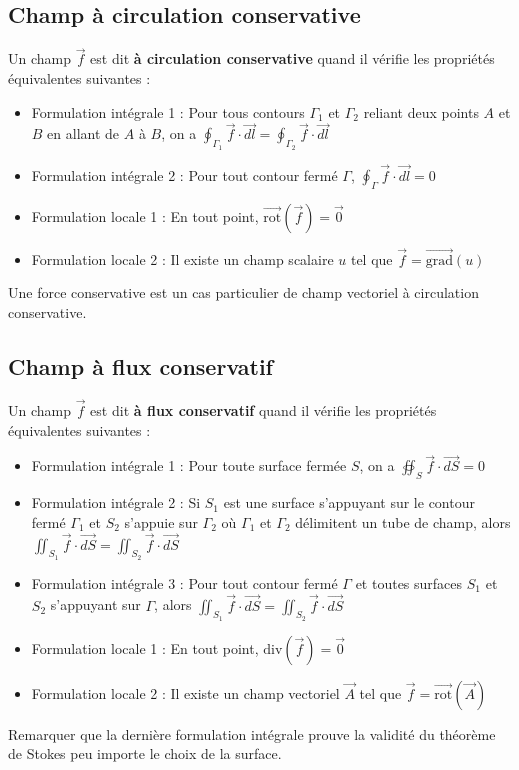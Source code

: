 \documentclass[french]{book}
\theoremstyle{plain}
\theoremstyle{definition}
\theoremstyle{remark}
\newcommand{\grad}{\overrightarrow{\text{grad}}}
\newcommand{\rot}{\overrightarrow{\text{rot}}}
\renewcommand{\div}{\text{div}}
\begin{document}
\subsection{Champ à circulation conservative}
Un champ $\overrightarrow{f}$ est dit \textbf{à circulation conservative} quand il vérifie les propriétés équivalentes suivantes :
\begin{itemize}
	\item Formulation intégrale 1 : Pour tous contours $\Gamma_1$ et $\Gamma_2$ reliant deux points $A$ et $B$ en allant de $A$ à $B$, on a $\displaystyle\oint_{\Gamma_1}\overrightarrow{f}\cdot\overrightarrow{dl}=\oint_{\Gamma_2}\overrightarrow{f}\cdot\overrightarrow{dl}$
	\item Formulation intégrale 2 : Pour tout contour fermé $\Gamma$, $\displaystyle\oint_\Gamma\overrightarrow{f}\cdot\overrightarrow{dl}=0$
	\item Formulation locale 1 : En tout point, $\rot(\overrightarrow{f})=\overrightarrow{0}$
	\item Formulation locale 2 : Il existe un champ scalaire $u$ tel que $\overrightarrow{f}=\grad(u)$
\end{itemize}
Une force conservative est un cas particulier de champ vectoriel à circulation conservative.
\subsection{Champ à flux conservatif}
Un champ $\overrightarrow{f}$ est dit \textbf{à flux conservatif} quand il vérifie les propriétés équivalentes suivantes :
\begin{itemize}
	\item Formulation intégrale 1 : Pour toute surface fermée $S$, on a $\displaystyle\oiint_S\overrightarrow{f}\cdot\overrightarrow{dS}=0$
	\item Formulation intégrale 2 : Si $S_1$ est une surface s'appuyant sur le contour fermé $\Gamma_1$ et $S_2$ s'appuie sur $\Gamma_2$ où $\Gamma_1$ et $\Gamma_2$ délimitent un tube de champ, alors $\displaystyle\iint_{S_1}\overrightarrow{f}\cdot\overrightarrow{dS}=\iint_{S_2}\overrightarrow{f}\cdot\overrightarrow{dS}$
	\item Formulation intégrale 3 : Pour tout contour fermé $\Gamma$ et toutes surfaces $S_1$ et $S_2$ s'appuyant sur $\Gamma$, alors $\displaystyle\iint_{S_1}\overrightarrow{f}\cdot\overrightarrow{dS}=\iint_{S_2}\overrightarrow{f}\cdot\overrightarrow{dS}$
	\item Formulation locale 1 : En tout point, $\div(\overrightarrow{f})=\overrightarrow{0}$
	\item Formulation locale 2 : Il existe un champ vectoriel $\overrightarrow{A}$ tel que $\overrightarrow{f}=\rot(\overrightarrow{A})$
\end{itemize}
Remarquer que la dernière formulation intégrale prouve la validité du théorème de Stokes peu importe le choix de la surface.
\end{document}
